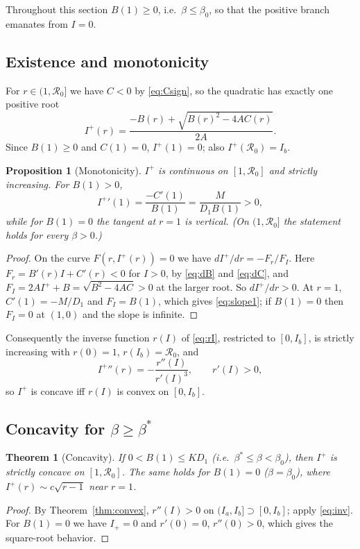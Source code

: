 \documentclass[11pt]{article}
\newtheorem{proposition}[lemma]{Proposition}
\newtheorem{theorem}[lemma]{Theorem}
\theoremstyle{remark}
\newcommand{\R}{\mathcal R_0}
\begin{document}
Throughout this section $B(1)\ge0$, i.e.\ $\beta\le\beta_0$, so that the positive branch emanates from $I=0$.

\subsection{Existence and monotonicity}

For $r\in(1,\R]$ we have $C<0$ by \eqref{eq:Csign}, so the quadratic has exactly one positive root
\[
I^+(r)=\frac{-B(r)+\sqrt{B(r)^2-4AC(r)}}{2A}.
\]
Since $B(1)\ge0$ and $C(1)=0$, $I^+(1)=0$; also $I^+(\R)=I_b$.

\begin{proposition}[Monotonicity]\label{prop:mono}
$I^+$ is continuous on $[1,\R]$ and strictly increasing. For $B(1)>0$,
\begin{equation}
{I^+}'(1)=\frac{-C'(1)}{B(1)}=\frac{M}{D_1B(1)}>0 ,
\label{eq:slope1}
\end{equation}
while for $B(1)=0$ the tangent at $r=1$ is vertical. (On $(1,\R]$ the statement holds for every $\beta>0$.)
\end{proposition}
\begin{proof}
On the curve $F(r,I^+(r))=0$ we have $dI^+/dr=-F_r/F_I$. Here $F_r=B'(r)I+C'(r)<0$ for $I>0$, by \eqref{eq:dB} and \eqref{eq:dC}, and $F_I=2AI^++B=\sqrt{B^2-4AC}>0$ at the larger root. So $dI^+/dr>0$. At $r=1$, $C'(1)=-M/D_1$ and $F_I=B(1)$, which gives \eqref{eq:slope1}; if $B(1)=0$ then $F_I=0$ at $(1,0)$ and the slope is infinite.
\end{proof}

Consequently the inverse function $r(I)$ of \eqref{eq:rI}, restricted to $[0,I_b]$, is strictly increasing with $r(0)=1$, $r(I_b)=\R$, and
\begin{equation}
{I^+}''(r)=-\frac{r''(I)}{r'(I)^3},\qquad r'(I)>0 ,
\label{eq:inv}
\end{equation}
so $I^+$ is concave iff $r(I)$ is convex on $[0,I_b]$.

\subsection{Concavity for $\beta\ge\beta^*$}

\begin{theorem}[Concavity]\label{thm:concave1}
If $0<B(1)\le KD_1$ (i.e.\ $\beta^*\le\beta<\beta_0$), then $I^+$ is strictly concave on $[1,\R]$. The same holds for $B(1)=0$ ($\beta=\beta_0$), where $I^+(r)\sim c\sqrt{r-1}$ near $r=1$.
\end{theorem}
\begin{proof}
By Theorem~\ref{thm:convex}, $r''(I)>0$ on $(I_a,I_b]\supset[0,I_b]$; apply \eqref{eq:inv}. For $B(1)=0$ we have $I_+=0$ and $r'(0)=0$, $r''(0)>0$, which gives the square-root behavior.
\end{proof}
\end{document}
